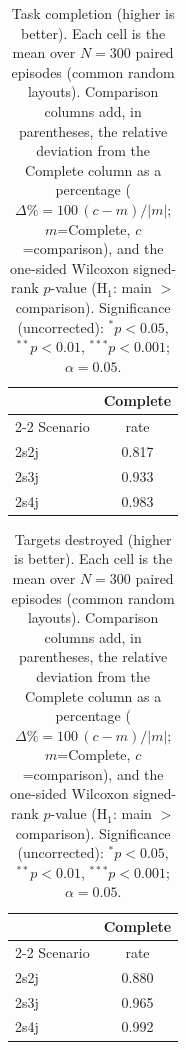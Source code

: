 
\begin{table}[ht]
  \centering
  \caption{Task completion (higher is better). Each cell is the mean over $N=300$ paired episodes (common random layouts). Comparison columns add, in parentheses, the relative deviation from the Complete column as a percentage ($\Delta\%=100\,(c-m)/|m|$; $m$=Complete, $c$=comparison), and the one-sided Wilcoxon signed-rank $p$-value (H$_1$: main $>$ comparison). Significance (uncorrected): $^{*}p<0.05$, $^{**}p<0.01$, $^{***}p<0.001$; $\alpha=0.05$.}
  \label{tab:wilcoxon-completion}
  \small
  \begin{tabular}{l c}
    \toprule
     & Complete \\
    \cmidrule(lr){2-2}
    Scenario & {rate} \\
    \midrule
    2s2j & 0.817 \\
    2s3j & 0.933 \\
    2s4j & 0.983 \\
    \bottomrule
  \end{tabular}
\end{table}

\begin{table}[ht]
  \centering
  \caption{Targets destroyed (higher is better). Each cell is the mean over $N=300$ paired episodes (common random layouts). Comparison columns add, in parentheses, the relative deviation from the Complete column as a percentage ($\Delta\%=100\,(c-m)/|m|$; $m$=Complete, $c$=comparison), and the one-sided Wilcoxon signed-rank $p$-value (H$_1$: main $>$ comparison). Significance (uncorrected): $^{*}p<0.05$, $^{**}p<0.01$, $^{***}p<0.001$; $\alpha=0.05$.}
  \label{tab:wilcoxon-targets}
  \small
  \begin{tabular}{l c}
    \toprule
     & Complete \\
    \cmidrule(lr){2-2}
    Scenario & {rate} \\
    \midrule
    2s2j & 0.880 \\
    2s3j & 0.965 \\
    2s4j & 0.992 \\
    \bottomrule
  \end{tabular}
\end{table}

